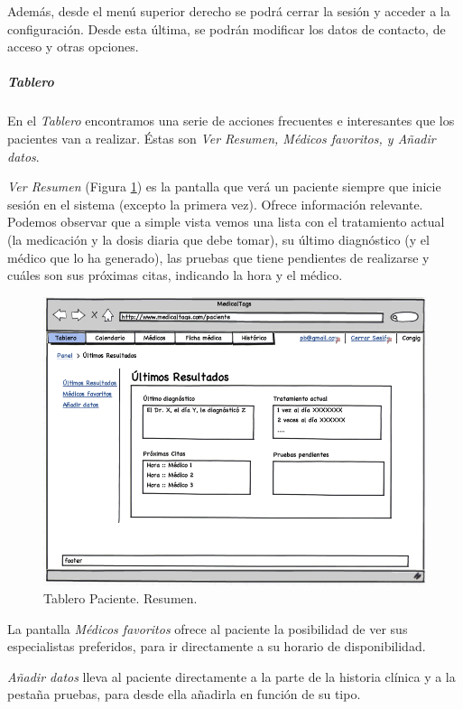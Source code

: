 		Además, desde el menú superior derecho se podrá cerrar la sesión y acceder a la configuración. Desde esta última, se podrán modificar los datos de contacto, de acceso y otras opciones.
		
		\subparagraph{Tablero} %
		\label{par:paciente_tablero}
		En el \textit{Tablero} encontramos una serie de acciones frecuentes e interesantes que los pacientes van a realizar. Éstas son \textit{Ver Resumen, Médicos favoritos, y Añadir datos}.
		
		\textit{Ver Resumen} (Figura \ref{fig:iu_tablero_paciente_resumen}) es la pantalla que verá un paciente siempre que inicie sesión en el sistema (excepto la primera vez). Ofrece información relevante. Podemos observar que a simple vista vemos una lista con el tratamiento actual (la medicación y la dosis diaria que debe tomar), su último diagnóstico (y el médico que lo ha generado), las pruebas que tiene pendientes de realizarse y cuáles son sus próximas citas, indicando la hora y el médico.
	
		\begin{figure}[H]
		  \centering
		    \includegraphics[width=12cm]{img/png/interfaz/26_Tablero_Paciente1.png}
		  \caption{Tablero Paciente. Resumen.}
		  \label{fig:iu_tablero_paciente_resumen}
		\end{figure}
		
		La pantalla \textit{Médicos favoritos} ofrece al paciente la posibilidad de ver sus especialistas preferidos, para ir directamente a su horario de disponibilidad.	
		
		\textit{Añadir datos} lleva al paciente directamente a la parte de la historia clínica y a la pestaña pruebas, para desde ella añadirla en función de su tipo.
		
